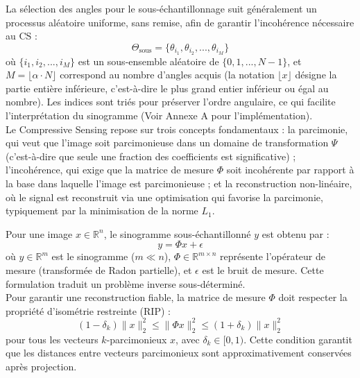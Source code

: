 La sélection des angles pour le sous-échantillonnage suit généralement un processus aléatoire uniforme, sans remise, afin de garantir l'incohérence nécessaire au CS :
\begin{equation}
\Theta_{\text{sous}} = \{\theta_{i_1}, \theta_{i_2}, ..., \theta_{i_M}\}
\end{equation}
où \(\{i_1, i_2, ..., i_M\}\) est un sous-ensemble aléatoire de \(\{0, 1, ..., N-1\}\), et \(M = \lfloor \alpha \cdot N \rfloor\) correspond au nombre d'angles acquis (la notation \(\lfloor x \rfloor\) désigne la partie entière inférieure, c'est-à-dire le plus grand entier inférieur ou égal au nombre). Les indices sont triés pour préserver l'ordre angulaire, ce qui facilite l'interprétation du sinogramme (Voir Annexe A pour l'implémentation).\\

Le Compressive Sensing repose sur trois concepts fondamentaux : la parcimonie, qui veut que l'image soit parcimonieuse dans un domaine de transformation \(\Psi\) (c'est-à-dire que seule une fraction des coefficients est significative) ; l'incohérence, qui exige que la matrice de mesure \(\Phi\) soit incohérente par rapport à la base dans laquelle l'image est parcimonieuse ; et la reconstruction non-linéaire, où le signal est reconstruit via une optimisation qui favorise la parcimonie, typiquement par la minimisation de la norme \(L_1\).  

Pour une image \(x \in \mathbb{R}^n\), le sinogramme sous-échantillonné \(y\) est obtenu par :
\begin{equation}
y = \Phi x + \epsilon
\end{equation}
où \(y \in \mathbb{R}^m\) est le sinogramme (\(m \ll n\)), \(\Phi \in \mathbb{R}^{m \times n}\) représente l'opérateur de mesure (transformée de Radon partielle), et \(\epsilon\) est le bruit de mesure. Cette formulation traduit un problème inverse sous-déterminé.\\

Pour garantir une reconstruction fiable, la matrice de mesure \(\Phi\) doit respecter la propriété d'isométrie restreinte (RIP) :
\begin{equation}
(1-\delta_k)\|x\|_2^2 \leq \|\Phi x\|_2^2 \leq (1+\delta_k)\|x\|_2^2
\end{equation}
pour tous les vecteurs \(k\)-parcimonieux \(x\), avec \(\delta_k \in [0,1)\). Cette condition garantit que les distances entre vecteurs parcimonieux sont approximativement conservées après projection.\\

